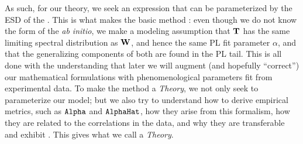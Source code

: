 As such, for our \SETOL theory, we seek an expression that can be parameterized by the %
ESD of the \Teacher.
This is what makes the basic method \SemiEmpirical: even though we do not know the form of the \Teacher \emph{ab initio},
we make a modeling assumption that ${\mathbf{T}}$ has the same limiting spectral distribution as ${\mathbf{W}}$, and hence the same PL fit parameter $\alpha$, and that the generalizing components of both are found in the PL tail. 
This is all done with the understanding that later we will augment
(and hopefully ``correct'') our mathematical formulations with 
phenomenological parameters fit from experimental data.
To make the \SemiEmpirical method a \SemiEmpirical \emph{Theory}, 
we not only seek to parameterize our model; but we also try to understand 
how to derive \HTSR empirical metrics, such as $\texttt{Alpha}$ and $\texttt{AlphaHat}$,
how they arise from this formalism, 
how they are related to the correlations in the data, and 
why they are transferable and exhibit \Universality.
This gives what we call a \SemiEmpirical \emph{Theory}.
